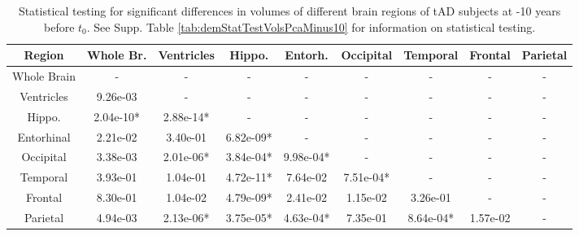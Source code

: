 \begin{table}
\centering
\begin{tabular}{c |c c c c c c c c }
Region & Whole Br. & Ventricles & Hippo. & Entorh. & Occipital & Temporal & Frontal & Parietal\\
\hline 
Whole Brain & - & - & - & - & - & - & - & -\\
Ventricles & 9.26e-03 & - & - & - & - & - & - & -\\
Hippo. & 2.04e-10* & 2.88e-14* & - & - & - & - & - & -\\
Entorhinal & 2.21e-02 & 3.40e-01 & 6.82e-09* & - & - & - & - & -\\
Occipital & 3.38e-03 & 2.01e-06* & 3.84e-04* & 9.98e-04* & - & - & - & -\\
Temporal & 3.93e-01 & 1.04e-01 & 4.72e-11* & 7.64e-02 & 7.51e-04* & - & - & -\\
Frontal & 8.30e-01 & 1.04e-02 & 4.79e-09* & 2.41e-02 & 1.15e-02 & 3.26e-01 & - & -\\
Parietal & 4.94e-03 & 2.13e-06* & 3.75e-05* & 4.63e-04* & 7.35e-01 & 8.64e-04* & 1.57e-02 & -\\

\end{tabular} 
\caption[Statistical testing for significant differences in volumes of different brain regions of tAD subjects at -10 years before $t_0$.]{Statistical testing for significant differences in volumes of different brain regions of tAD subjects at -10 years before $t_0$. See Supp. Table \ref{tab:demStatTestVolsPcaMinus10} for information on statistical testing.} 
\label{tab:demStatTestVolsAdMinus10}
\end{table}


